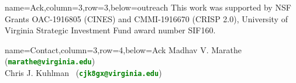 \documentclass[landscape,paperwidth=70in,paperheight=46in,fontscale=0.225]{baposter} %
\begin{document}
\begin{poster}
          {name=Ack,column=3,row=3,below=outreach}{
{\footnotesize
This work was supported by
NSF Grants OAC-1916805 (CINES) and CMMI-1916670 (CRISP 2.0),
University of Virginia Strategic Investment Fund award
number SIF160.
}
}

          {name=Contact,column=3,row=4,below=Ack}{
{\footnotesize
{Madhav V. Marathe~ (\textcolor{green}{\textbf{\texttt{marathe@virginia.edu}}})}\\
{Chris J. Kuhlman~ (\textcolor{green}{\textbf{\texttt{cjk8gx@virginia.edu}}})}
}}

\end{poster}
\end{document}
